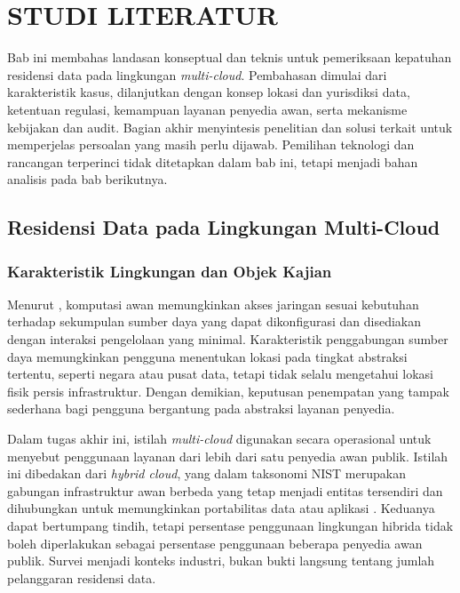 \cleardoublepage
\chapter{STUDI LITERATUR}
\setlength{\emergencystretch}{1.5em}
\label{chap:studi-literatur}

Bab ini membahas landasan konseptual dan teknis untuk pemeriksaan kepatuhan residensi data pada lingkungan \textit{multi-cloud}. Pembahasan dimulai dari karakteristik kasus, dilanjutkan dengan konsep lokasi dan yurisdiksi data, ketentuan regulasi, kemampuan layanan penyedia awan, serta mekanisme kebijakan dan audit. Bagian akhir menyintesis penelitian dan solusi terkait untuk memperjelas persoalan yang masih perlu dijawab. Pemilihan teknologi dan rancangan terperinci tidak ditetapkan dalam bab ini, tetapi menjadi bahan analisis pada bab berikutnya.

\section{Residensi Data pada Lingkungan Multi-Cloud}
\label{sec:kasus-multicloud}
\subsection{Karakteristik Lingkungan dan Objek Kajian}
Menurut \textcite{nist2011}, komputasi awan memungkinkan akses jaringan sesuai kebutuhan terhadap sekumpulan sumber daya yang dapat dikonfigurasi dan disediakan dengan interaksi pengelolaan yang minimal. Karakteristik penggabungan sumber daya memungkinkan pengguna menentukan lokasi pada tingkat abstraksi tertentu, seperti negara atau pusat data, tetapi tidak selalu mengetahui lokasi fisik persis infrastruktur. Dengan demikian, keputusan penempatan yang tampak sederhana bagi pengguna bergantung pada abstraksi layanan penyedia.

Dalam tugas akhir ini, istilah \textit{multi-cloud} digunakan secara operasional untuk menyebut penggunaan layanan dari lebih dari satu penyedia awan publik. Istilah ini dibedakan dari \textit{hybrid cloud}, yang dalam taksonomi NIST merupakan gabungan infrastruktur awan berbeda yang tetap menjadi entitas tersendiri dan dihubungkan untuk memungkinkan portabilitas data atau aplikasi \autocite{nist2011}. Keduanya dapat bertumpang tindih, tetapi persentase penggunaan lingkungan hibrida tidak boleh diperlakukan sebagai persentase penggunaan beberapa penyedia awan publik. Survei \textcite{flexera2026} menjadi konteks industri, bukan bukti langsung tentang jumlah pelanggaran residensi data.

